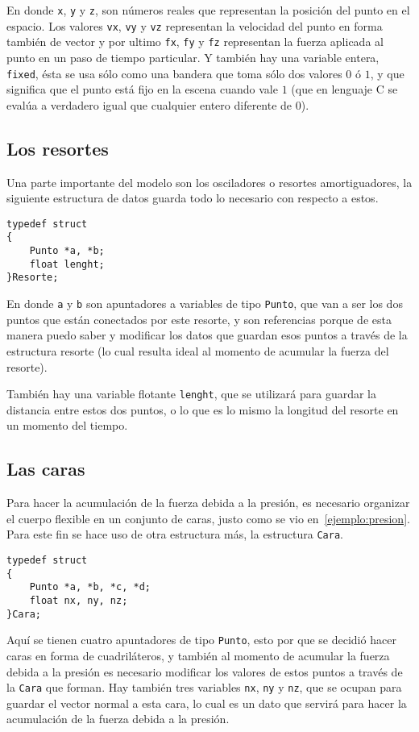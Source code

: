 En donde \verb|x|, \verb|y| y \verb|z|, son números reales que representan la posición del punto en el espacio. Los valores \verb|vx|, \verb|vy| y \verb|vz| representan la velocidad del punto en forma también de vector y por ultimo \verb|fx|, \verb|fy| y \verb|fz| representan la fuerza aplicada al punto en un paso de tiempo particular. Y también hay una variable entera, \verb|fixed|, ésta se usa sólo como una bandera que toma sólo dos valores $0$ ó $1$, y que significa que el punto está fijo en la escena cuando vale $1$ (que en lenguaje C se evalúa a verdadero igual que cualquier entero diferente de $0$).

\subsection{Los resortes}

Una parte importante del modelo son los osciladores o resortes amortiguadores, la siguiente estructura de datos guarda todo lo necesario con respecto a estos.

\begin{verbatim}
typedef struct
{
    Punto *a, *b;
    float lenght;
}Resorte;
\end{verbatim} 

En donde \verb|a| y \verb|b| son apuntadores a variables de tipo \verb|Punto|, que van a ser los dos puntos que están conectados por este resorte, y son referencias porque de esta manera puedo saber y modificar los datos que guardan esos puntos a través de la estructura resorte (lo cual resulta ideal al momento de acumular la fuerza del resorte).

También hay una variable flotante \verb|lenght|, que se utilizará para guardar la distancia entre estos dos puntos, o lo que es lo mismo la longitud del resorte en un momento del tiempo.

\subsection{Las caras}
Para hacer la acumulación de la fuerza debida a la presión, es necesario organizar el cuerpo flexible en un conjunto de caras, justo como se vio en~\ref{ejemplo:presion}. Para este fin se hace uso de otra estructura más, la estructura \verb|Cara|.
\begin{verbatim}
typedef struct
{
    Punto *a, *b, *c, *d;
    float nx, ny, nz;
}Cara;
\end{verbatim}
Aquí se tienen cuatro apuntadores de tipo \verb|Punto|, esto por que se decidió hacer caras en forma de cuadriláteros, y también al momento de acumular la fuerza debida a la presión es necesario modificar los valores de estos puntos a través de la \verb|Cara| que forman. Hay también tres variables \verb|nx|, \verb|ny| y \verb|nz|, que se ocupan para guardar el vector normal a esta cara, lo cual es un dato que servirá para hacer la acumulación de la fuerza debida a la presión.
